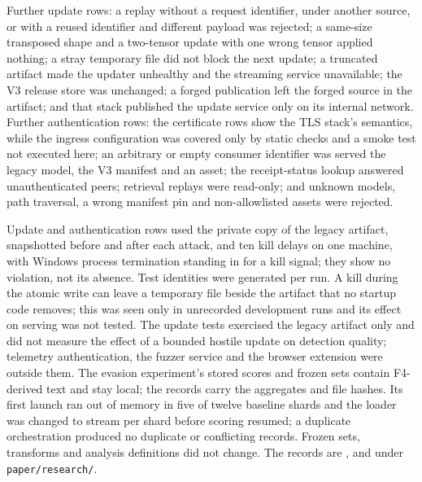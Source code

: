 \documentclass[sigconf]{acmart}
\theoremstyle{acmdefinition}\newtheorem{property}{Property}
\begin{document}
Further update rows: a replay without a request identifier, under another source, or with a reused identifier and different payload was rejected; a same-size transposed shape and a two-tensor update with one wrong tensor applied nothing; a stray temporary file did not block the next update; a truncated artifact made the updater unhealthy and the streaming service unavailable; the V3 release store was unchanged; a forged publication left the forged source in the artifact; and that stack published the update service only on its internal network. Further authentication rows: the certificate rows show the TLS stack's semantics, while the ingress configuration was covered only by static checks and a smoke test not executed here; an arbitrary or empty consumer identifier was served the legacy model, the V3 manifest and an asset; the receipt-status lookup answered unauthenticated peers; retrieval replays were read-only; and unknown models, path traversal, a wrong manifest pin and non-allowlisted assets were rejected.

Update and authentication rows used the private copy of the legacy artifact, snapshotted before and after each attack, and ten kill delays on one machine, with Windows process termination standing in for a kill signal; they show no violation, not its absence. Test identities were generated per run. A kill during the atomic write can leave a temporary file beside the artifact that no startup code removes; this was seen only in unrecorded development runs and its effect on serving was not tested. The update tests exercised the legacy artifact only and did not measure the effect of a bounded hostile update on detection quality; telemetry authentication, the fuzzer service and the browser extension were outside them. The evasion experiment's stored scores and frozen sets contain F4-derived text and stay local; the records carry the aggregates and file hashes. Its first launch ran out of memory in five of twelve baseline shards and the loader was changed to stream per shard before scoring resumed; a duplicate orchestration produced no duplicate or conflicting records. Frozen sets, transforms and analysis definitions did not change. The records are ,  and  under \texttt{paper/research/}.
\end{document}
